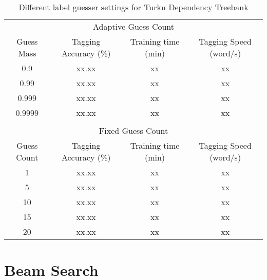 \begin{table}[htb!]
\begin{center}
\begin{tabular}{cccc}
\multicolumn{4}{c}{Adaptive Guess Count}\\
Guess Mass & Tagging Accuracy (\%) & Training time (min) & Tagging Speed (word/s)\\
\hline
0.9        & xx.xx            & xx            & xx            \\
0.99       & xx.xx            & xx            & xx            \\
0.999      & xx.xx            & xx            & xx            \\
0.9999     & xx.xx            & xx            & xx            \\
\hline
           &                  &               &               \\
\multicolumn{4}{c}{Fixed Guess Count}\\
Guess Count & Tagging Accuracy (\%) & Training time (min) & Tagging Speed (word/s) \\
\hline
1        & xx.xx            & xx            & xx            \\
5        & xx.xx            & xx            & xx            \\
10       & xx.xx            & xx            & xx            \\
15       & xx.xx            & xx            & xx            \\
20       & xx.xx            & xx            & xx            \\
\hline
\end{tabular}
\caption{Different label guesser settings for Turku Dependency Treebank}
\end{center}
\end{table}

\section{Beam Search}

